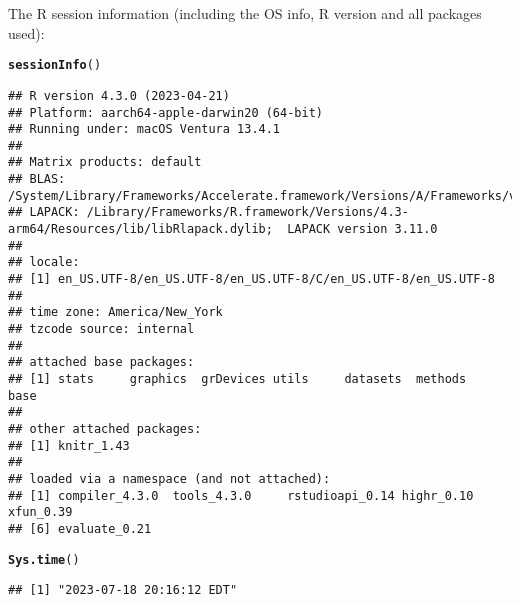 \documentclass{article}\usepackage[]{graphicx}\usepackage[]{xcolor}
\makeatletter
\newcommand{\hlstd}[1]{\textcolor[rgb]{0.345,0.345,0.345}{#1}}%
\newcommand{\hlkwd}[1]{\textcolor[rgb]{0.737,0.353,0.396}{\textbf{#1}}}%
\newenvironment{kframe}{%
 \def\at@end@of@kframe{}%
 \ifinner\ifhmode%
  \def\at@end@of@kframe{\end{minipage}}%
  \begin{minipage}{\columnwidth}%
 \fi\fi%
 \def\FrameCommand##1{\hskip\@totalleftmargin \hskip-\fboxsep
 \colorbox{shadecolor}{##1}\hskip-\fboxsep
     \hskip-\linewidth \hskip-\@totalleftmargin \hskip\columnwidth}%
 \MakeFramed {\advance\hsize-\width
   \@totalleftmargin\z@ \linewidth\hsize
   \@setminipage}}%
 {\par\unskip\endMakeFramed%
 \at@end@of@kframe}
\newenvironment{knitrout}{}{} %
\makeatother
\begin{document}
The R session information (including the OS info, R version and all
packages used):

\begin{knitrout}
\color{fgcolor}\begin{kframe}
\begin{alltt}
\hlkwd{sessionInfo}\hlstd{()}
\end{alltt}
\begin{verbatim}
## R version 4.3.0 (2023-04-21)
## Platform: aarch64-apple-darwin20 (64-bit)
## Running under: macOS Ventura 13.4.1
## 
## Matrix products: default
## BLAS:   /System/Library/Frameworks/Accelerate.framework/Versions/A/Frameworks/vecLib.framework/Versions/A/libBLAS.dylib 
## LAPACK: /Library/Frameworks/R.framework/Versions/4.3-arm64/Resources/lib/libRlapack.dylib;  LAPACK version 3.11.0
## 
## locale:
## [1] en_US.UTF-8/en_US.UTF-8/en_US.UTF-8/C/en_US.UTF-8/en_US.UTF-8
## 
## time zone: America/New_York
## tzcode source: internal
## 
## attached base packages:
## [1] stats     graphics  grDevices utils     datasets  methods   base     
## 
## other attached packages:
## [1] knitr_1.43
## 
## loaded via a namespace (and not attached):
## [1] compiler_4.3.0  tools_4.3.0     rstudioapi_0.14 highr_0.10      xfun_0.39      
## [6] evaluate_0.21
\end{verbatim}
\begin{alltt}
\hlkwd{Sys.time}\hlstd{()}
\end{alltt}
\begin{verbatim}
## [1] "2023-07-18 20:16:12 EDT"
\end{verbatim}
\end{kframe}
\end{knitrout}
\end{document}
